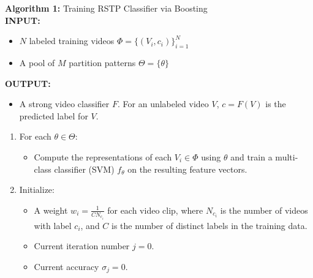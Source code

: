 \documentclass[10pt,twocolumn,letterpaper]{article}
\begin{document}
	\noindent\textbf{Algorithm 1:} Training RSTP Classifier via Boosting \\
	\textbf{INPUT:} 
	\begin{itemize}
		\item $N$ labeled training videos $\Phi = \{(V_i, c_i)\}_{i=1}^N$
		\item A pool of $M$ partition patterns $\Theta = \{\theta\}$
	\end{itemize}
	\textbf{OUTPUT:}
	\begin{itemize}
		\item A strong video classifier $F$. For an unlabeled video $V$, 
			$c=F(V)$ is the predicted label for $V$.
	\end{itemize}
			\begin{enumerate}

				\item For each $\theta \in \Theta$:
					\begin{itemize}
            \item Compute the representations of each $V_i \in \Phi$ using $\theta$
						and train a multi-class classifier (SVM) $f_\theta$ on the
            resulting feature vectors.
					\end{itemize}

				\item Initialize:
					\begin{itemize}
						\item A weight $w_i = \frac{1}{C N_{c_i}}$ for each video clip,
							where $N_{c_i}$ is the number of videos with label $c_i$,
              and $C$ is the number of distinct labels in the training data.
						\item Current iteration number $j=0$.
						\item Current accuracy $\sigma_j = 0$.
					\end{itemize}


\end{enumerate}
\end{document}
